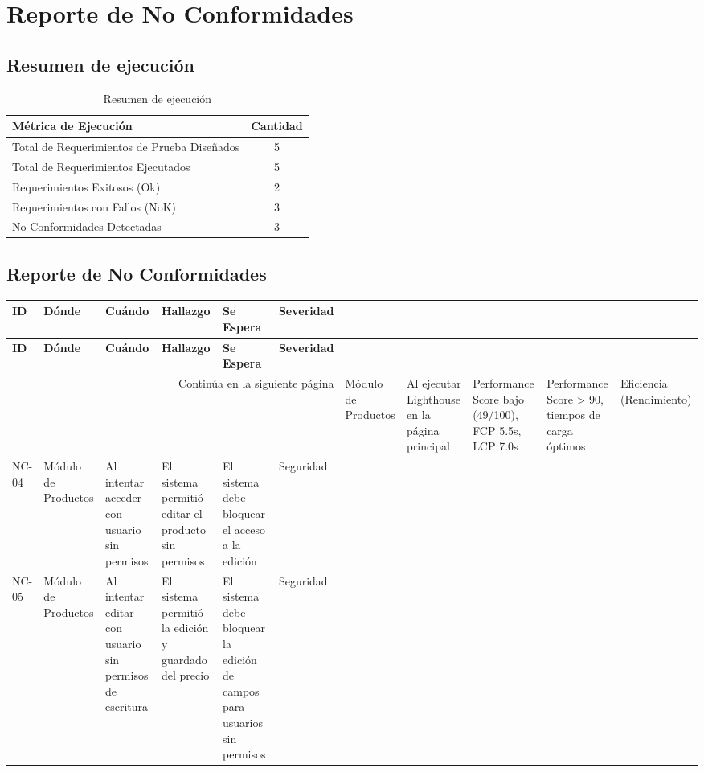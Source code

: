 \documentclass[12pt, letterpaper]{article}
\begin{document}
\newpage

\section{Reporte de No Conformidades}

\subsection{Resumen de ejecución}

\begin{table}[H]
\centering
\caption{Resumen de ejecución}
\begin{tabular}{|l|c|}
\hline
\textbf{Métrica de Ejecución} & \textbf{Cantidad} \\
\hline
Total de Requerimientos de Prueba Diseñados & 5 \\
Total de Requerimientos Ejecutados & 5 \\
Requerimientos Exitosos (Ok) & 2 \\
Requerimientos con Fallos (NoK) & 3 \\
No Conformidades Detectadas & 3 \\
\hline
\end{tabular}
\end{table}

\subsection{Reporte de No Conformidades}

\setlength{\LTleft}{-0.5cm}
\begin{footnotesize}
\begin{longtable}{|p{1.5cm}|p{2.2cm}|p{3.5cm}|p{3.5cm}|p{2.2cm}|p{1.8cm}|}
\hline
\textbf{ID} & \textbf{Dónde} & \textbf{Cuándo} & \textbf{Hallazgo} & \textbf{Se Espera} & \textbf{Severidad} \\
\hline
\endfirsthead
\hline
\textbf{ID} & \textbf{Dónde} & \textbf{Cuándo} & \textbf{Hallazgo} & \textbf{Se Espera} & \textbf{Severidad} \\
\hline
\endhead
\hline
\multicolumn{6}{r}{Continúa en la siguiente página}
\endfoot
\hline
\endlastfoot
NC-03 & Módulo de Productos & Al ejecutar Lighthouse en la página principal & Performance Score bajo (49/100), FCP 5.5s, LCP 7.0s & Performance Score > 90, tiempos de carga óptimos & Eficiencia (Rendimiento) \\
\hline
NC-04 & Módulo de Productos & Al intentar acceder con usuario sin permisos & El sistema permitió editar el producto sin permisos & El sistema debe bloquear el acceso a la edición & Seguridad \\
\hline
NC-05 & Módulo de Productos & Al intentar editar con usuario sin permisos de escritura & El sistema permitió la edición y guardado del precio & El sistema debe bloquear la edición de campos para usuarios sin permisos & Seguridad \\
\hline
\end{longtable}
\end{footnotesize}
\end{document}

